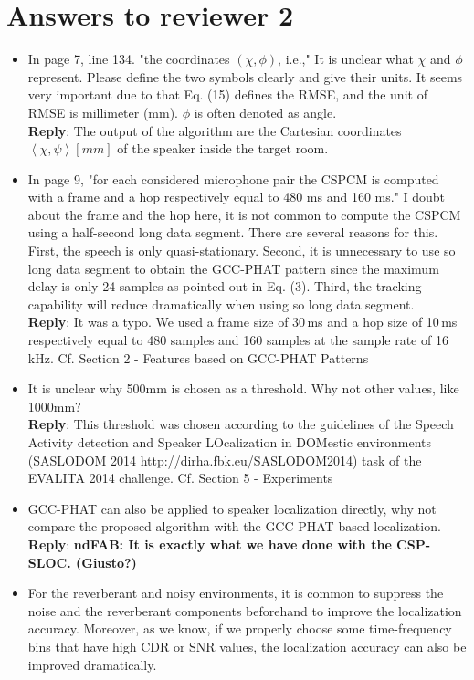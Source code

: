 \documentclass[11pt, technote, letterpaper, oneside, onecolumn]{IEEEtran}
\begin{document}
\section{Answers to reviewer 2}\label{sec:rev2}
\begin{itemize}
\item In page 7, line 134. "the coordinates $(\chi,\phi)$, i.e.," It is unclear what $\chi$ and $\phi$ represent. Please define the two symbols clearly and give their units. It seems very important due to that Eq. (15) defines the RMSE, and the unit of RMSE is millimeter (mm). $\phi$ is often denoted as angle.\\
\textbf{Reply}:  The output of the algorithm are the Cartesian coordinates $\left \langle \chi,\psi \right \rangle \left [mm\right ]$ of the speaker inside the target room.
\item  In page 9, "for each considered microphone pair the CSPCM is computed with a frame and a hop respectively equal to 480 ms and 160 ms." I doubt about the frame and the hop here, it is not common to compute the CSPCM using a half-second long data segment. There are several reasons for this. First, the speech is only quasi-stationary. Second, it is unnecessary to use so long data segment to obtain the GCC-PHAT pattern since the maximum delay is only 24 samples as pointed out in Eq. (3). Third, the tracking capability will reduce dramatically when using so long data segment.\\
\textbf{Reply}:  It was a typo. We used a frame size of 30\,ms and a hop size of 10\,ms respectively equal to 480 samples and 160 samples at the sample rate of 16\,kHz. Cf. Section 2 - Features based on GCC-PHAT Patterns
\item  It is unclear why 500mm is chosen as a threshold. Why not other values, like 1000mm?\\
\textbf{Reply}: This threshold was chosen according to the guidelines of the Speech Activity detection and Speaker LOcalization in DOMestic environments (SASLODOM 2014 http://dirha.fbk.eu/SASLODOM2014) task of the EVALITA 2014 challenge. Cf. Section 5 - Experiments
\item  GCC-PHAT can also be applied to speaker localization directly, why not compare the proposed algorithm with the GCC-PHAT-based localization. \\
\textbf{Reply}: \textbf{ndFAB: It is exactly what we have done with the CSP-SLOC. (Giusto?)}
\item  For the reverberant and noisy environments, it is common to suppress the noise and the reverberant components beforehand to improve the localization accuracy. Moreover, as we know, if we properly choose some time-frequency bins that have high CDR or SNR values, the localization accuracy can also be improved dramatically.\\

\end{itemize}
\end{document}
